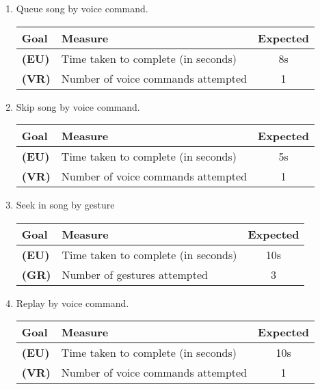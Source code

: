 \documentclass[12pt,letterpaper]{article}
\begin{document}
\begin{enumerate}
\item Queue song by voice command.
\begin{center}\begin{tabular}{l|l|c}
\textbf{Goal} & \textbf{Measure} & \textbf{Expected} \\
\hline
\textbf{(EU)} & Time taken to complete (in seconds) & 8s \\
\hline
\textbf{(VR)} & Number of voice commands attempted & 1 \\
\hline
\end{tabular}\end{center}

\item Skip song by voice command.
\begin{center}\begin{tabular}{l|l|c}
\textbf{Goal} & \textbf{Measure} & \textbf{Expected} \\
\hline
\textbf{(EU)} & Time taken to complete (in seconds) & 5s \\
\hline
\textbf{(VR)} & Number of voice commands attempted & 1 \\
\hline
\end{tabular}\end{center}

\item Seek in song by gesture
\begin{center}\begin{tabular}{l|l|c}
\textbf{Goal} & \textbf{Measure} & \textbf{Expected} \\
\hline
\textbf{(EU)} & Time taken to complete (in seconds) & 10s \\
\hline
\textbf{(GR)} & Number of gestures attempted & 3 \\
\hline
\end{tabular}\end{center}

\item Replay by voice command.
\begin{center}\begin{tabular}{l|l|c}
\textbf{Goal} & \textbf{Measure} & \textbf{Expected} \\
\hline
\textbf{(EU)} & Time taken to complete (in seconds) & 10s \\
\hline
\textbf{(VR)} & Number of voice commands attempted & 1 \\
\hline
\end{tabular}\end{center}


\end{enumerate}
\end{document}

